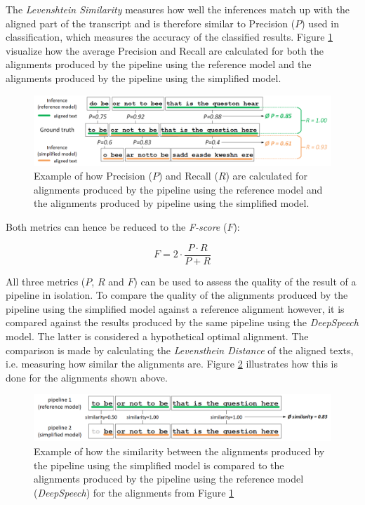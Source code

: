The \textit{Levenshtein Similarity} measures how well the inferences match up with the aligned part of the transcript and is therefore similar to Precision ($P$) used in classification, which measures the accuracy of the classified results. Figure \ref{precision_recall_fscore} visualize how the average Precision and Recall are calculated for both the alignments produced by the pipeline using the reference model and the alignments produced by the pipeline using the simplified model.

\begin{figure}[h!]
	\includegraphics[width=\linewidth]{./img/precision_recall_fscore.png}
	\caption{Example of how Precision ($P$) and Recall ($R$) are calculated for alignments produced by the pipeline using the reference model and the alignments produced by pipeline using the simplified model.}
	\label{precision_recall_fscore}
\end{figure}

Both metrics can hence be reduced to the \textit{F-score} ($F$):

\[ 
F = 2\cdot \frac{P\cdot R}{P+R}
\]

All three metrics ($P$, $R$ and $F$) can be used to assess the quality of the result of a pipeline in isolation. To compare the quality of the alignments produced by the pipeline using the simplified model against a reference alignment however, it is compared against the results produced by the same pipeline using the \textit{DeepSpeech} model. The latter is considered a hypothetical optimal alignment. The comparison is made by calculating the \textit{Levensthein Distance} of the aligned texts, i.e. measuring how similar the alignments are. Figure \ref{alignment_similarity} illustrates how this is done for the alignments shown above.

\begin{figure}[h!]
	\includegraphics[width=\linewidth]{./img/alignment_similarity.png}
	\caption{Example of how the similarity between the alignments produced by the pipeline using the simplified model is compared to the alignments produced by the pipeline using the reference model (\textit{DeepSpeech}) for the alignments from Figure \ref{precision_recall_fscore}}
	\label{alignment_similarity}
\end{figure}


